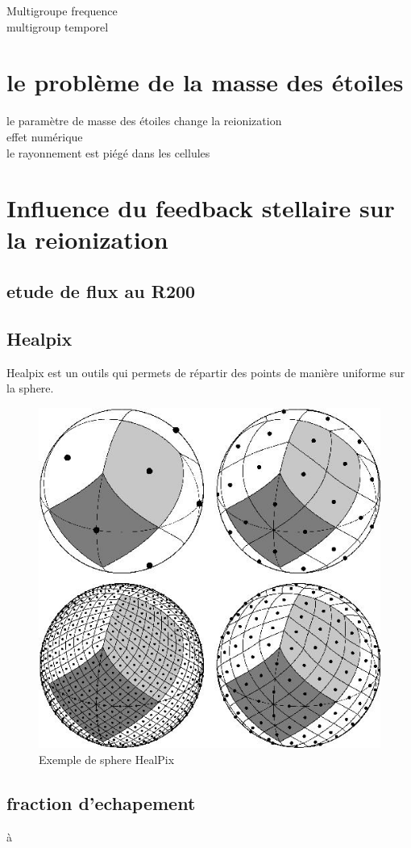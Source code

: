 Multigroupe frequence\\
multigroup temporel\\


\section{le problème de la masse des étoiles}

le paramètre de masse des étoiles change la reionization\\
effet numérique\\
le rayonnement est piégé dans les cellules\\






\section{Influence du feedback stellaire sur la reionization}

\subsection{etude de flux au R200}

\subsection{Healpix}
\label{sec:healpix}

Healpix est un outils qui permets de répartir des points de manière uniforme sur la sphere.

\begin{figure}[bth]
        \includegraphics[width=.95\linewidth]{img/03/healpix.jpg} 
        \caption{Exemple de sphere HealPix}
 		\label{fig:HealPix}
\end{figure}



\subsection{fraction d'echapement}à

